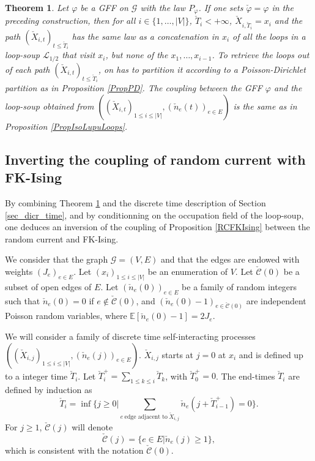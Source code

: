 \documentclass[11pt,a4paper]{amsart}
\numberwithin{equation}{section}
\newtheorem{theorem}{Theorem}
\begin{document}
\begin{theorem}
\label{ThmPoissonLoopSoup}
Let $\varphi$ be a GFF on $\mathcal{G}$ with the law $P_{\varphi}$.
If one sets $\check{\varphi}=\varphi$ in the preceding construction, then
for all $i\in \lbrace 1,\dots,\vert V\vert\rbrace$,
$\check{T}_{i}<+\infty$, 
$\check{X}_{i,\check{T}_{i}} = x_{i}$ and the
path $(\check{X}_{i,t})_{t\leq\check{T}_{i}}$ has the same law as a concatenation in $x_{i}$ of all the loops in a loop-soup
$\mathcal{L}_{1/2}$ that visit $x_{i}$, but none of the
$x_{1},\dots,x_{i-1}$. To retrieve the loops out of each path
$(\check{X}_{i,t})_{t\leq\check{T}_{i}}$, on has to partition it according to
a Poisson-Dirichlet partition as in Proposition \ref{PropPD}.
The coupling between the GFF $\varphi$ and the loop-soup obtained from
$((\check X_{i,t})_{1\leq i\leq\vert V\vert}, 
(\check n_e(t))_{e\in E})$ is the same as in Proposition
\ref{PropIsoLupuLoops}.
\end{theorem}

\subsection{Inverting the coupling of random current with FK-Ising}
\label{sec:coupinv}
By combining Theorem \ref{ThmPoissonLoopSoup} and the discrete time
description of Section \ref{sec_dicr_time}, and by conditionning on the occupation field of the loop-soup, one deduces an inversion of the coupling 
of Proposition \ref{RCFKIsing} between the random current and FK-Ising.

We consider that the graph $\mathcal{G}=(V,E)$ and that the edges are endowed with weights $(J_{e})_{e\in E}$. Let
$(x_{i})_{1\le i\le \vert V\vert}$ be an enumeration of $V$.
Let $\check{\mathcal{C}}(0)$ be a subset of open edges of $E$.
Let $(\check{n}_{e}(0))_{e\in E}$ be a family of 
random integers such that
$\check{n}_{e}(0)=0$ if $e\not\in\check{\mathcal{C}}(0)$, and
$(\check{n}_{e}(0)-1)_{e\in\check{\mathcal{C}}(0)}$ 
are independent Poisson random variables, where 
$\mathbb{E}[\check{n}_{e}(0)-1]=2J_{e}$.

We will consider a family of discrete time self-interacting processes
$((\check X_{i,j})_{1\leq i\leq \vert V\vert},
(\check{n}_{e}(j))_{e\in E})$. $\check X_{i,j}$ starts at $j=0$ at
$x_{i}$ and is defined up to a integer time $\check{T}_{i}$.
Let $\check{T}_{i}^{+}=\sum_{1\leq k\leq i}\check{T}_{k}$, with
$\check{T}_{0}^{+}=0$. The end-times $\check{T}_{i}$ are defined by induction as
\begin{displaymath}
\check{T}_{i}=
\inf\Big\lbrace j\geq 0\Big\vert 
\sum_{e~\text{edge adjacent to}~\check X_{i,j}}
\check{n}_{e}(j+\check{T}_{i-1}^{+})=0\Big\rbrace.
\end{displaymath}
For $j\geq 1$, $\check{\mathcal{C}}(j)$ will denote
\begin{displaymath}
\check{\mathcal{C}}(j)=\lbrace e\in E\vert \check{n}_{e}(j)\geq 1\rbrace,
\end{displaymath}
which is consistent with the notation $\check{\mathcal{C}}(0)$.
\end{document}
